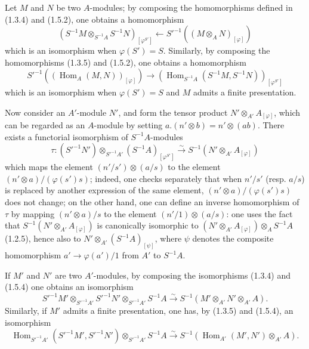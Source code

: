 \begin{env}[1.5.3]
\label{0.1.5.3}
Let $M$ and $N$ be two $A$-modules; by composing the homomorphisms defined in (1.3.4) and (1.5.2), one obtains a homomorphism
\[
  (S^{-1}M\otimes_{S^{-1}A}S^{-1}N)_{[\varphi^{S'}]}
  \longleftarrow
  S'^{-1}((M\otimes_A N)_{[\varphi]})
\]
which is an isomorphism when $\varphi(S')=S$.
Similarly, by composing the homomorphisms (1.3.5) and (1.5.2), one obtains a homomorphism
\[
  S'^{-1}((\operatorname{Hom}_A(M,N))_{[\varphi]})
  \longrightarrow
  (\operatorname{Hom}_{S^{-1}A}(S^{-1}M,S^{-1}N))_{[\varphi^{S'}]}
\]
which is an isomorphism when $\varphi(S')=S$ and $M$ admits a finite presentation.
\end{env}

\begin{env}[1.5.4]
\label{0.1.5.4}
Now consider an $A'$-module $N'$, and form the tensor product $N'\otimes_{A'}A_{[\varphi]}$, which can be regarded as an $A$-module by setting $a.(n'\otimes b)=n'\otimes(ab)$.
There exists a functorial isomorphism of $S^{-1}A$-modules
\[
  \tau:(S'^{-1}N')\otimes_{S'^{-1}A'}(S^{-1}A)_{[\varphi^{S'}]}
  \xrightarrow{\sim}
  S^{-1}(N'\otimes_{A'}A_{[\varphi]})
\]
which maps the element $(n'/s')\otimes(a/s)$ to the element
$(n'\otimes a)/(\varphi(s')s)$; indeed, one checks separately that when
$n'/s'$ (resp. $a/s$) is replaced by another expression of the same element,
$(n'\otimes a)/(\varphi(s')s)$ does not change; on the other hand, one can define an
inverse homomorphism of $\tau$ by mapping $(n'\otimes a)/s$ to the element
$(n'/1)\otimes(a/s)$: one uses the fact that
$S^{-1}(N'\otimes_{A'}A_{[\varphi]})$ is canonically isomorphic to
$(N'\otimes_{A'}A_{[\varphi]})\otimes_A S^{-1}A$ (1.2.5), hence also to
$N'\otimes_{A'}(S^{-1}A)_{[\psi]}$, where $\psi$ denotes the composite
homomorphism $a'\to\varphi(a')/1$ from $A'$ to $S^{-1}A$.
\end{env}

\begin{env}[1.5.5]
\label{0.1.5.5}
If $M'$ and $N'$ are two $A'$-modules, by composing the isomorphisms (1.3.4)
and (1.5.4) one obtains an isomorphism
\[
  S'^{-1}M'\otimes_{S'^{-1}A'}S'^{-1}N'
  \otimes_{S'^{-1}A'}S^{-1}A
  \xrightarrow{\sim}
  S^{-1}(M'\otimes_{A'}N'\otimes_{A'}A).
\]
Similarly, if $M'$ admits a finite presentation, one has, by (1.3.5) and
(1.5.4), an isomorphism
\[
  \operatorname{Hom}_{S'^{-1}A'}(S'^{-1}M',S'^{-1}N')
  \otimes_{S'^{-1}A'}S^{-1}A
  \xrightarrow{\sim}
  S^{-1}(\operatorname{Hom}_{A'}(M',N')\otimes_{A'}A).
\]
\end{env}

